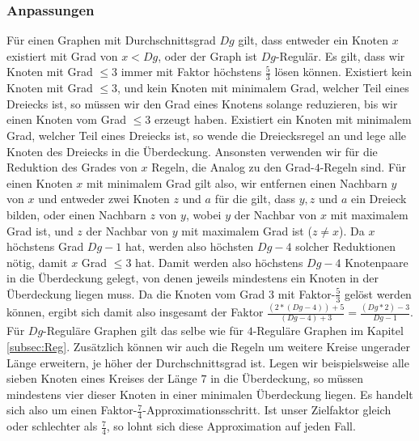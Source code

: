\documentclass[12pt,onecolumn, notitlepage]{scrartcl}
\begin{document}
\subsubsection{Anpassungen}
Für einen Graphen mit Durchschnittsgrad $Dg$ gilt, dass entweder ein Knoten $x$ existiert mit Grad von $x < Dg$, oder der Graph ist $Dg$-Regulär. Es gilt, dass wir Knoten mit Grad $\leq 3$ immer mit Faktor höchstens $\frac{5}{3}$ lösen können. Existiert kein Knoten mit Grad $\leq 3$, und kein Knoten mit minimalem Grad, welcher Teil eines Dreiecks ist, so müssen wir den Grad eines Knotens solange reduzieren, bis wir einen Knoten vom Grad $\leq 3$ erzeugt haben. Existiert ein Knoten mit minimalem Grad, welcher Teil eines Dreiecks ist, so wende die Dreiecksregel an und lege alle Knoten des Dreiecks in die Überdeckung. Ansonsten verwenden wir für die Reduktion des Grades von $x$ Regeln, die Analog zu den Grad-$4$-Regeln sind. Für einen Knoten $x$ mit minimalem Grad gilt also, wir entfernen einen Nachbarn $y$ von $x$ und entweder zwei Knoten $z$ und $a$ für die gilt, dass $y, z$ und $a$ ein Dreieck bilden, oder einen Nachbarn $z$ von $y$, wobei $y$ der Nachbar von $x$ mit maximalem Grad ist, und $z$ der Nachbar von $y$ mit maximalem Grad ist ($z \neq x$). \newline
Da $x$ höchstens Grad $Dg - 1$ hat, werden also höchsten $Dg - 4$ solcher Reduktionen nötig, damit $x$ Grad $\leq 3$ hat. Damit werden also höchstens $Dg - 4$ Knotenpaare in die Überdeckung gelegt, von denen jeweils mindestens ein Knoten in der Überdeckung liegen muss. Da die Knoten vom Grad $3$ mit Faktor-$\frac{5}{3}$ gelöst werden können, ergibt sich damit also insgesamt der Faktor $\frac{(2 * (Dg - 4)) + 5}{(Dg -4) + 3} = \frac{(Dg * 2) - 3}{Dg - 1}$.\newline
Für $Dg$-Reguläre Graphen gilt das selbe wie für $4$-Reguläre Graphen im Kapitel \ref{subsec:Reg}.\newline
Zusätzlich können wir auch die Regeln um weitere Kreise ungerader Länge erweitern, je höher der Durchschnittsgrad ist. Legen wir beispielsweise alle sieben Knoten eines Kreises der Länge $7$ in die Überdeckung, so müssen mindestens vier dieser Knoten in einer minimalen Überdeckung liegen. Es handelt sich also um einen Faktor-$\frac{7}{4}$-Approximationsschritt. Ist unser Zielfaktor gleich oder schlechter als $\frac{7}{4}$, so lohnt sich diese Approximation auf jeden Fall.\newline\newline
\end{document}
